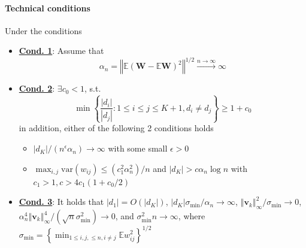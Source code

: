 \documentclass[twoside]{article}
\begin{document}
\paragraph*{Technical conditions} Under the conditions 
\begin{itemize}
    \item \underline{\textbf{Cond. 1}}: Assume that $$ \alpha_n = \left\Vert \mathbb{E}\left(\mathbf{W}-\mathbb{E}\mathbf{W}\right)^2 \right\Vert^{1/2} \xrightarrow{n\rightarrow\infty} \infty $$
    \item \underline{\textbf{Cond. 2}}: $\exists c_0 <1$, s.t. $$ \min \left\{ \frac{|d_i|}{|d_j|}: 1\leq i \leq j \leq K+1, d_i \neq d_j \right\} \geq 1+c_0 $$
    in addition, either of the following 2 conditions holds
    \begin{itemize}
        \item $\left\vert d_K \right\vert / (n^{\epsilon}\alpha_n)\rightarrow\infty $ with some small $\epsilon >0$
        \item $\max_{i,j}\mathrm{var}(w_{ij})\leq \left(c_1^2\alpha_n^2\right)/n$ and $\left\vert d_K \right\vert > c\alpha_n \log n$ with $c_1 >1, c>4 c_1(1+c_0/2) $
    \end{itemize}
    \item \underline{\textbf{Cond. 3}}: It holds that $\left\vert d_1 \right\vert = O(\left\vert d_K \right\vert)$, $\left\vert d_K \right\vert\sigma_{\min}/\alpha_n\rightarrow\infty $, $\left\Vert \mathbf{v}_k \right\Vert^2_{\infty}/\sigma_{\min}\rightarrow 0$, $\alpha^4_n \left\Vert \mathbf{v}_k \right\Vert^4_{\infty}/(\sqrt{n}\sigma^2_{\min})\rightarrow 0$, and $\sigma^2_{\min}n \rightarrow \infty$, where $\sigma_{\min} = \left\{ \min_{1\leq i,j,\leq n,i\neq j} \mathbb{E} w_{ij}^2 \right\}^{1/2}$
\end{itemize}
\end{document}
